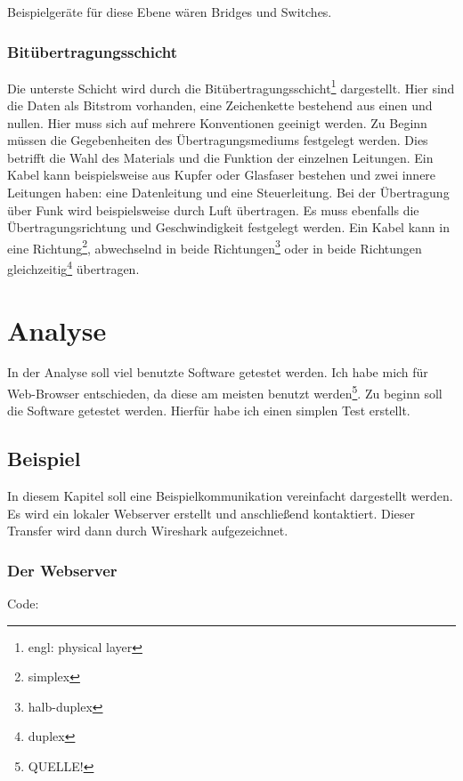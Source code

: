 \documentclass[12pt]{article}
\begin{document}
	Beispielgeräte für diese Ebene wären Bridges und Switches.

\subsubsection{Bitübertragungsschicht}
	Die unterste Schicht wird durch die Bitübertragungsschicht\footnote{engl: physical layer} dargestellt. Hier sind die Daten als Bitstrom vorhanden, eine Zeichenkette bestehend aus einen und nullen. Hier muss sich auf mehrere Konventionen geeinigt werden. Zu Beginn müssen die Gegebenheiten des Übertragungsmediums festgelegt werden. Dies betrifft die Wahl des Materials und die Funktion der einzelnen Leitungen. Ein Kabel kann beispielsweise aus Kupfer oder Glasfaser bestehen und zwei innere Leitungen haben: eine Datenleitung und eine Steuerleitung. Bei der Übertragung über Funk wird beispielsweise durch Luft übertragen. Es muss ebenfalls die Übertragungsrichtung und Geschwindigkeit festgelegt werden. Ein Kabel kann in eine Richtung\footnote{simplex}, abwechselnd in beide Richtungen\footnote{halb-duplex} oder in beide Richtungen gleichzeitig\footnote{duplex} übertragen.





\section{Analyse}
In der Analyse soll viel benutzte Software getestet werden. Ich habe mich für Web-Browser entschieden, da diese am meisten benutzt werden\footnote{QUELLE!}. Zu beginn soll die Software getestet werden. Hierfür habe ich einen simplen Test erstellt.
\subsection{Beispiel}
In diesem Kapitel soll eine Beispielkommunikation vereinfacht dargestellt werden. Es wird ein lokaler Webserver erstellt und anschließend kontaktiert. Dieser Transfer wird dann durch Wireshark aufgezeichnet.

\subsubsection{Der Webserver}
Code: 
\end{document}

